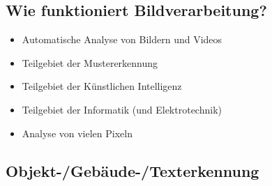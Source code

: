 \documentclass[paper=a4, fontsize=11pt]{scrartcl} %
\numberwithin{equation}{section} %
\numberwithin{figure}{section} %
\numberwithin{table}{section} %
\begin{document}
\subsection{Wie funktioniert Bildverarbeitung?}

\begin{itemize}
\item Automatische Analyse von Bildern und Videos
\item Teilgebiet der Mustererkennung
\item Teilgebiet der Künstlichen Intelligenz
\item Teilgebiet der Informatik (und Elektrotechnik)
\item Analyse von vielen Pixeln
\end{itemize}

\subsection{Objekt-/Gebäude-/Texterkennung}
\end{document}
